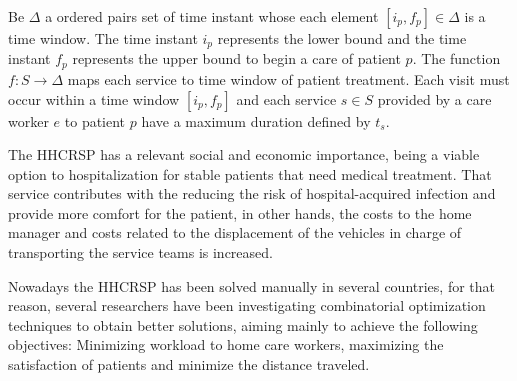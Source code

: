 Be $\Delta$ a ordered pairs set  of time instant whose each element $[i_p, f_p] \in \Delta$ is a time window. The time instant $i_{p}$ represents the lower bound and the time instant $f_{p}$ represents the upper bound to begin a care of patient $p$. The function $f: S \rightarrow \Delta$ maps each service to time window 
 of patient treatment. Each visit must occur within a time window $[i_{p},f_{p}]$ and each service $s \in S$ provided by a care worker $e$ to patient $p$ have a maximum duration defined by $t_s$.
 
The \ac{HHCRSP} has a relevant social and economic importance, being a viable option to hospitalization for stable patients that need medical treatment. That service contributes with the reducing the risk of hospital-acquired infection and provide more comfort for the patient, in other hands, the costs to the home manager and costs related to the displacement of the vehicles in charge of transporting the service teams is increased. 

Nowadays the \ac{HHCRSP} has been solved manually in several countries, for that reason, several researchers have been investigating combinatorial optimization techniques to obtain better solutions, aiming mainly to achieve the following objectives: Minimizing workload to home care workers, maximizing the satisfaction of patients and minimize the distance traveled.
